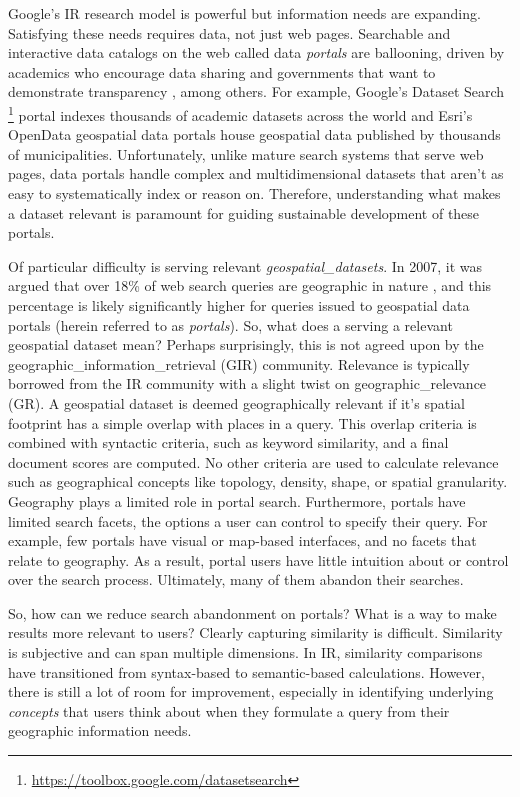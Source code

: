 Google’s IR research model is powerful but information needs are expanding. Satisfying these needs requires data, not just web pages. Searchable and interactive data catalogs on the web called data \emph{portals} are ballooning, driven by academics who encourage data sharing \cite{Lafia2016} and governments that want to demonstrate transparency \cite{Pereira2017}, among others. For example, Google’s Dataset Search \footnote{\url{https://toolbox.google.com/datasetsearch}} portal indexes thousands of academic datasets across the world and Esri's OpenData geospatial data portals house geospatial data published by thousands of municipalities. Unfortunately, unlike mature search systems that serve web pages, data portals handle complex and multidimensional datasets that aren't as easy to systematically index or reason on. Therefore, understanding what makes a dataset relevant is paramount for guiding sustainable development of these portals.

Of particular difficulty is serving relevant \emph{\gls{geospatial_datasets}}. In 2007, it was argued that over 18\% of web search queries are geographic in nature \cite{Sanderson2007}, and this percentage is likely significantly higher for queries issued to geospatial data portals (herein referred to as \emph{\gls{portals}}). So, what does a serving a relevant geospatial dataset mean? Perhaps surprisingly, this is not agreed upon by the \gls{geographic_information_retrieval} (\acrshort{GIR}) community. Relevance is typically borrowed from the IR community with a slight twist on \gls{geographic_relevance} (\acrshort{GR}). A geospatial dataset is deemed geographically relevant if it’s spatial footprint has a simple overlap with places in a query. This overlap criteria is combined with syntactic criteria, such as keyword similarity, and a final document scores are computed. No other criteria are used to calculate relevance such as geographical concepts like topology, density, shape, or spatial granularity. Geography plays a limited role in portal search. Furthermore, portals have limited search facets, the options a user can control to specify their query. For example, few portals have visual or map-based interfaces, and no facets that relate to geography. As a result, portal users have little intuition about or control over the search process. Ultimately, many of them abandon their searches.

So, how can we reduce search abandonment on portals? What is a way to make results more relevant to users? Clearly capturing similarity is difficult. Similarity is subjective and can span multiple dimensions. In IR, similarity comparisons have transitioned from syntax-based to semantic-based calculations. However, there is still a lot of room for improvement, especially in identifying underlying \emph{concepts} that users think about when they formulate a query from their geographic information needs.

